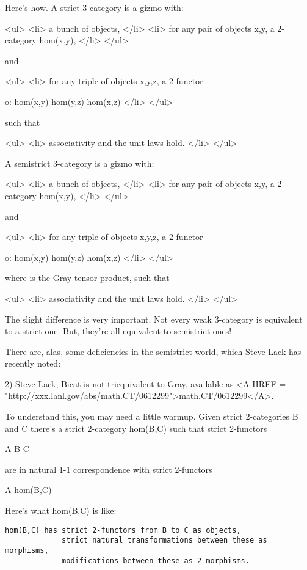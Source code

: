 Here's how.  A strict 3-category is a gizmo with:

<ul>
<li>
a bunch of objects,
</li>
<li>
for any pair of objects x,y, a 2-category hom(x,y), 
</li>
</ul>

and

<ul>
<li>
for any triple of objects x,y,z, a 2-functor 

o: hom(x,y) \times  hom(y,z) \to  hom(x,z)
</li>
</ul>

such that

<ul>
<li>
associativity and the unit laws hold.
</li>
</ul>

A semistrict 3-category is a gizmo with:

<ul>
<li>
a bunch of objects,
</li>
<li>
for any pair of objects x,y, a 2-category hom(x,y), 
</li>
</ul>

and

<ul>
<li>
for any triple of objects x,y,z, a 2-functor 

o: hom(x,y) \otimes  hom(y,z) \to  hom(x,z)
</li>
</ul>

where \otimes  is the Gray tensor product, such that

<ul>
<li>
associativity and the unit laws hold.
</li>
</ul>

The slight difference is very important.  Not every weak 3-category
is equivalent to a strict one.  But, they're all equivalent to 
semistrict ones!   

There are, alas, some deficiencies in the semistrict world, which
Steve Lack has recently noted:

2) Steve Lack, Bicat is not triequivalent to Gray, available as <A
HREF = "http://xxx.lanl.gov/abs/math.CT/0612299">math.CT/0612299</A>.

To understand this, you may need a little warmup.  Given strict 
2-categories B and C there's a strict 2-category hom(B,C) such that 
strict 2-functors

A \times  B \to  C

are in natural 1-1 correspondence with strict 2-functors

A \to  hom(B,C)

Here's what hom(B,C) is like:

\begin{verbatim}
hom(B,C) has strict 2-functors from B to C as objects,
             strict natural transformations between these as morphisms,
             modifications between these as 2-morphisms.
\end{verbatim}
    
